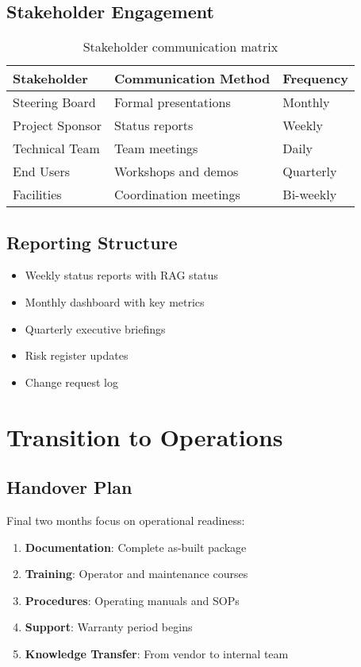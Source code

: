 \subsection{Stakeholder Engagement}

\begin{table}[H]
\centering
\begin{tabularx}{\textwidth}{@{}lXl@{}}
\toprule
\textbf{Stakeholder} & \textbf{Communication Method} & \textbf{Frequency} \\
\midrule
Steering Board & Formal presentations & Monthly \\
Project Sponsor & Status reports & Weekly \\
Technical Team & Team meetings & Daily \\
End Users & Workshops and demos & Quarterly \\
Facilities & Coordination meetings & Bi-weekly \\
\bottomrule
\end{tabularx}
\caption{Stakeholder communication matrix}
\end{table}

\subsection{Reporting Structure}

\begin{itemize}
    \item Weekly status reports with RAG status
    \item Monthly dashboard with key metrics
    \item Quarterly executive briefings
    \item Risk register updates
    \item Change request log
\end{itemize}

\section{Transition to Operations}

\subsection{Handover Plan}


Final two months focus on operational readiness:

\begin{enumerate}
    \item \textbf{Documentation}: Complete as-built package
    \item \textbf{Training}: Operator and maintenance courses
    \item \textbf{Procedures}: Operating manuals and SOPs
    \item \textbf{Support}: Warranty period begins
    \item \textbf{Knowledge Transfer}: From vendor to internal team
\end{enumerate}

